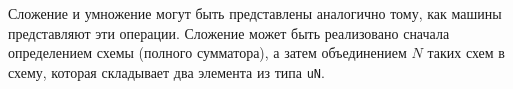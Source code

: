 Сложение и умножение могут быть представлены аналогично тому, как машины представляют эти операции. Сложение может быть реализовано сначала определением схемы  (полного сумматора), а затем объединением $N$ таких схем в схему, которая складывает два элемента из типа \texttt{uN}.

